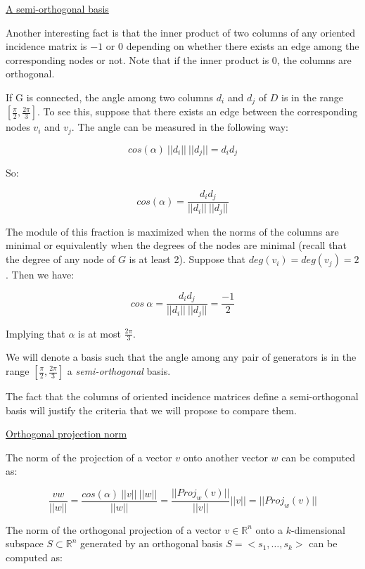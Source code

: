 \documentclass[a4paper,11pt]{article}
\begin{document}
\underline{A semi-orthogonal basis}

\bigskip

Another interesting fact is that the inner product of two columns of any 
oriented incidence matrix is $-1$ or $0$ depending on whether there exists an 
edge among the corresponding nodes or not. Note that if the inner 
product is $0$, the columns are orthogonal.

\bigskip

If G is connected, the angle among two columns $d_i$ and $d_j$ of $D$ is 
in the range $[\frac{\pi}{2},\frac{2\pi}{3}]$. To see this, suppose that there exists 
an edge between the corresponding nodes $v_i$ and $v_j$. The angle can be 
measured in the following way:

$$cos(\alpha) \ ||d_i|| \ ||d_j||= d_i  d_j$$

So: 

$$cos(\alpha) = \frac{d_i d_j}{||d_i|| \ ||d_j||}$$

The module of this fraction is maximized when the norms of the columns 
are minimal or equivalently when the degrees of the nodes are minimal 
(recall that the degree of any node of $G$ is at least 2). Suppose that 
$deg(v_i) = deg(v_j) = 2$. Then we have:

$$cos \ \alpha = \frac{d_i d_j}{||d_i|| \ ||d_j||} = \frac{-1}{2}$$

\bigskip

Implying that $\alpha$ is at most $\frac{2\pi}{3}$.

\bigskip

We will denote a basis such that the angle among any pair of generators 
is in the range $[\frac{\pi}{2},\frac{2\pi}{3}]$ a \textit{semi-orthogonal} 
basis.

\bigskip

The fact that the columns of oriented incidence matrices define a 
semi-orthogonal basis will justify the criteria that we will propose to 
compare them. 

\bigskip

\underline{Orthogonal projection norm}

\bigskip
The norm of the projection of a vector $v$ onto another vector $w$ can 
be computed as:

$$\frac{v w}{||w||} = \frac{cos(\alpha) \ ||v|| \ ||w||}{||w||} = \frac{||Proj_w(v)||}{||v||} ||v|| = ||Proj_w(v)||$$

\bigskip

The norm of the orthogonal projection of a vector $v \in \mathbb{R}^n$ 
onto a $k$-dimensional subspace $S \subset \mathbb{R}^n$ generated by an 
orthogonal basis $S = <s_1, \dots, s_k>$ can be computed as:
\end{document}
